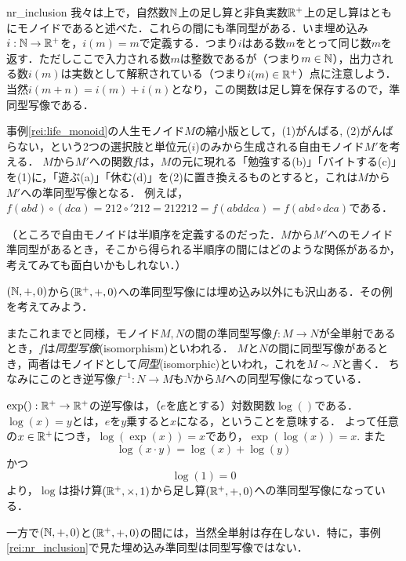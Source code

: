 \documentclass[11pt,a4paper, dvipdfmx]{jsarticle}
\begin{document}
\begin{rei}{}{nr_inclusion}
    我々は上で，自然数$\mathbb{N}$上の足し算と非負実数$\mathbb{R}^+$上の足し算はともにモノイドであると述べた．これらの間にも準同型がある．いま埋め込み$i:\mathbb{N} \to \mathbb{R}^+$を，$i(m)=m$で定義する．つまり$i$はある数$m$をとって同じ数$m$を返す．ただしここで入力される数$m$は整数であるが（つまり$m \in \mathbb{N}$），出力される数$i(m)$は実数として解釈されている（つまり$i(m) \in \mathbb{R}^+$）点に注意しよう．
    当然$i(m+n) = i(m)+i(n)$となり，この関数は足し算を保存するので，準同型写像である．
\end{rei} 

\begin{rei}{}{}
    事例\ref{rei:life_monoid}の人生モノイド$M$の縮小版として，(1)がんばる, (2)がんばらない，という2つの選択肢と単位元($i$)のみから生成される自由モノイド$M'$を考える．
    $M$から$M'$への関数$f$は，$M$の元に現れる「勉強する(b)」「バイトする(c)」を(1)に，「遊ぶ(a)」「休む(d)」を(2)に置き換えるものとすると，これは$M$から$M'$への準同型写像となる．
    例えば，$f(abd) \circ (dca) = 212 \circ' 212 = 212212 = f(abddca) = f(abd \circ dca)$である．

    （ところで自由モノイドは半順序を定義するのだった．$M$から$M'$へのモノイド準同型があるとき，そこから得られる半順序の間にはどのような関係があるか，考えてみても面白いかもしれない．）
\end{rei}


\begin{renshu}{}{}
    $(\mathbb{N}, +, 0)$から$(\mathbb{R}^+, +, 0)$への準同型写像には埋め込み以外にも沢山ある．その例を考えてみよう．
\end{renshu}


またこれまでと同様，モノイド$M, N$の間の準同型写像$f:M \to N$が全単射であるとき，$f$は\emph{同型写像}(isomorphism)といわれる．
$M$と$N$の間に同型写像があるとき，両者はモノイドとして\emph{同型}(isomorphic)といわれ，これを$M \sim N$と書く．
ちなみにこのとき逆写像$f^{-1}:N \to M$も$N$から$M$への同型写像になっている．


\begin{rei}{}{}
    $\exp():\mathbb{R}^+ \to \mathbb{R}^+$の逆写像は，（$e$を底とする）対数関数$\log()$である．
    $\log(x)=y$とは，$e$を$y$乗すると$x$になる，ということを意味する．
    よって任意の$x\in\mathbb{R}^+$につき，$\log(\exp(x))=x$であり，$\exp(\log(x))=x$. また
    \[ \log(x \cdot y) = \log(x) + \log(y) \]
    かつ
    \[ \log(1) = 0 \]
    より，$\log$は掛け算$(\mathbb{R}^+, \times, 1)$から足し算$(\mathbb{R}^+, +, 0)$への準同型写像になっている．

    一方で$(\mathbb{N}, +, 0)$と$(\mathbb{R}^+, +, 0)$の間には，当然全単射は存在しない．特に，事例\ref{rei:nr_inclusion}で見た埋め込み準同型は同型写像ではない．
\end{rei}
\end{document}
